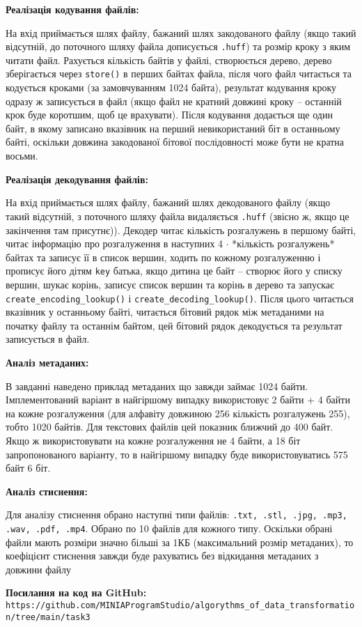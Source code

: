 \documentclass{article}
\def\code#1{\texttt{#1}}
\begin{document}
\textbf{Реалізація кодування файлів:}\\\indent

На вхід приймається шлях файлу, бажаний шлях закодованого файлу (якщо такий відсутній, до поточного шляху файла дописується \code{.huff}) та розмір кроку з яким читати файл. Рахується кількість байтів у файлі, створюється дерево, дерево зберігається через \code{store()} в перших байтах файла, після чого файл читається та кодується кроками (за замовчуванням 1024 байта), результат кодування кроку одразу ж записується в файл (якщо файл не кратний довжині кроку -- останній крок буде коротшим, щоб це врахувати). Після кодування додається ще один байт, в якому записано вказівник на перший невикористаний біт в останньому байті, оскільки довжина закодованої бітової послідовності може бути не кратна восьми.

\textbf{Реалізація декодування файлів:}\\\indent

На вхід приймається шлях файлу, бажаний шлях декодованого файлу (якщо такий відсутній, з поточного шляху файла видаляється \code{.huff} (звісно ж, якщо це закінчення там присутнє)). Декодер читає кількість розгалужень в першому байті, читає інформацію про розгалуження в наступних 4 $\cdot$ *кількість розгалужень* байтах та записує її в список вершин, ходить по кожному розгалуженню і прописує його дітям \code{key} батька, якщо дитина це байт -- створює його у списку вершин, шукає корінь, записує список вершин та корінь в дерево та запускає \code{create\_encoding\_lookup()} і \code{create\_decoding\_lookup()}. Після цього читається вказівник у останньому байті, читається бітовий рядок між метаданими на початку файлу та останнім байтом, цей бітовий рядок декодується та результат записується в файл.\\\indent

\newpage
\textbf{Аналіз метаданих:}\\\indent

В завданні наведено приклад метаданих що завжди займає 1024 байти. Імплементований варіант в найгіршому випадку використовує 2 байти + 4 байти на кожне розгалуження (для алфавіту довжиною 256 кількість розгалужень 255), тобто 1020 байтів. Для текстових файлів цей показник ближчий до 400 байт.\\\indent
Якщо ж використовувати на кожне розгалуження не 4 байти, а 18 біт запропонованого варіанту, то в найгіршому випадку буде використовуватись 575 байт 6 біт.\\\indent

\textbf{Аналіз стиснення:}\\\indent

Для аналізу стиснення обрано наступні типи файлів: \code{.txt, .stl, .jpg, .mp3, .wav, .pdf, .mp4}. Обрано по 10 файлів для кожного типу. Оскільки обрані файли мають розміри значно більші за 1КБ (максимальний розмір метаданих), то коефіцієнт стиснення завжди буде рахуватись без відкидання метаданих з довжини файлу


\textbf{Посилання на код на GitHub:}\\
\code{https://github.com/MINIAProgramStudio/algorythms\_of\_data\_transformation/tree/main/task3}
\end{document}
